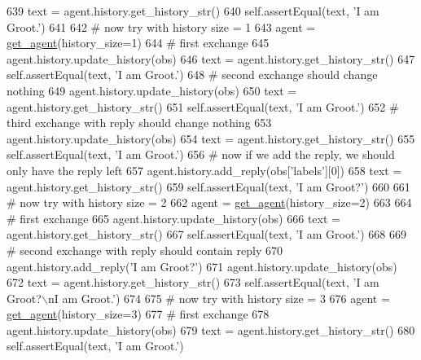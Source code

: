 \begin{DoxyCode}
639         text = agent.history.get\_history\_str()
640         self.assertEqual(text, \textcolor{stringliteral}{'I am Groot.'})
641 
642         \textcolor{comment}{# now try with history size = 1}
643         agent = \hyperlink{namespacetests_1_1test__torch__agent_ae929d109305aaea29fbfa13ecf1f32e9}{get\_agent}(history\_size=1)
644         \textcolor{comment}{# first exchange}
645         agent.history.update\_history(obs)
646         text = agent.history.get\_history\_str()
647         self.assertEqual(text, \textcolor{stringliteral}{'I am Groot.'})
648         \textcolor{comment}{# second exchange should change nothing}
649         agent.history.update\_history(obs)
650         text = agent.history.get\_history\_str()
651         self.assertEqual(text, \textcolor{stringliteral}{'I am Groot.'})
652         \textcolor{comment}{# third exchange with reply should change nothing}
653         agent.history.update\_history(obs)
654         text = agent.history.get\_history\_str()
655         self.assertEqual(text, \textcolor{stringliteral}{'I am Groot.'})
656         \textcolor{comment}{# now if we add the reply, we should only have the reply left}
657         agent.history.add\_reply(obs[\textcolor{stringliteral}{'labels'}][0])
658         text = agent.history.get\_history\_str()
659         self.assertEqual(text, \textcolor{stringliteral}{'I am Groot?'})
660 
661         \textcolor{comment}{# now try with history size = 2}
662         agent = \hyperlink{namespacetests_1_1test__torch__agent_ae929d109305aaea29fbfa13ecf1f32e9}{get\_agent}(history\_size=2)
663 
664         \textcolor{comment}{# first exchange}
665         agent.history.update\_history(obs)
666         text = agent.history.get\_history\_str()
667         self.assertEqual(text, \textcolor{stringliteral}{'I am Groot.'})
668 
669         \textcolor{comment}{# second exchange with reply should contain reply}
670         agent.history.add\_reply(\textcolor{stringliteral}{'I am Groot?'})
671         agent.history.update\_history(obs)
672         text = agent.history.get\_history\_str()
673         self.assertEqual(text, \textcolor{stringliteral}{'I am Groot?\(\backslash\)nI am Groot.'})
674 
675         \textcolor{comment}{# now try with history size = 3}
676         agent = \hyperlink{namespacetests_1_1test__torch__agent_ae929d109305aaea29fbfa13ecf1f32e9}{get\_agent}(history\_size=3)
677         \textcolor{comment}{# first exchange}
678         agent.history.update\_history(obs)
679         text = agent.history.get\_history\_str()
680         self.assertEqual(text, \textcolor{stringliteral}{'I am Groot.'})

\end{DoxyCode}
